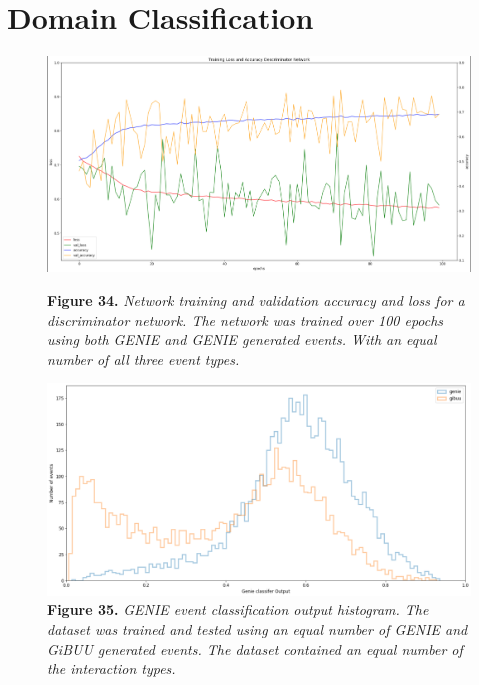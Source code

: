 \newpage

\section{Domain Classification}

\begin{figure}[h]
 \centering
 \includegraphics[width=160mm]{Descr/train.png}
 
  \textbf{Figure 34.} \textit{Network training and validation accuracy and loss for a discriminator network. The network was trained over 100 epochs using both GENIE and GENIE generated events. With an equal number of all three event types.}
\end{figure}

\begin{figure}[t!]
 \centering
 \includegraphics[width=160mm]{Descr/class.png}
 \textbf{Figure 35.} \textit{GENIE event classification output histogram. The dataset was trained and tested using an equal number of GENIE and GiBUU generated events. The dataset contained an equal number of the interaction types.}
\end{figure}

